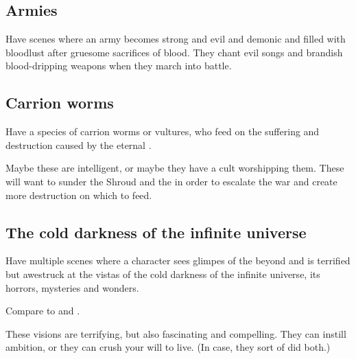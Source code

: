 \subsection{Armies}
Have scenes where an army becomes strong and evil and demonic and filled with bloodlust after gruesome sacrifices of blood.
They chant evil songs and brandish blood-dripping weapons when they march into battle.









\subsection{Carrion worms}
Have a species of carrion worms or vultures, who feed on the suffering and destruction caused by the eternal . 

Maybe these are intelligent, or maybe they have a cult worshipping them. These will want to sunder the Shroud and the \charade{} in order to escalate the war and create more destruction on which to feed. 







\subsection{The cold darkness of the infinite universe}
Have multiple scenes where a character sees glimpes of the beyond and is terrified but awestruck at the vistas of the cold darkness of the infinite universe, its horrors, mysteries and wonders. 

Compare to  and . 

These visions are terrifying, but also fascinating and compelling. They can instill ambition, or they can crush your will to live. (In  case, they sort of did both.)

